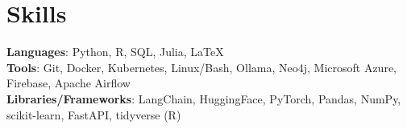 \documentclass[letterpaper,11pt]{article}
\begin{document}
\section{Skills}
  \begin{itemize}[leftmargin=0.15in, label={}]
      \small{\item{
      \textbf{Languages}{: Python, R, SQL, Julia, \LaTeX} \\
      \textbf{Tools}{: Git, Docker, Kubernetes, Linux/Bash, Ollama, Neo4j, Microsoft Azure, Firebase, Apache Airflow} \\
      \textbf{Libraries/Frameworks}{: LangChain, HuggingFace, PyTorch, Pandas, NumPy, scikit-learn, FastAPI, tidyverse (R)}  \\
      }}
  \end{itemize} 
\end{document}
